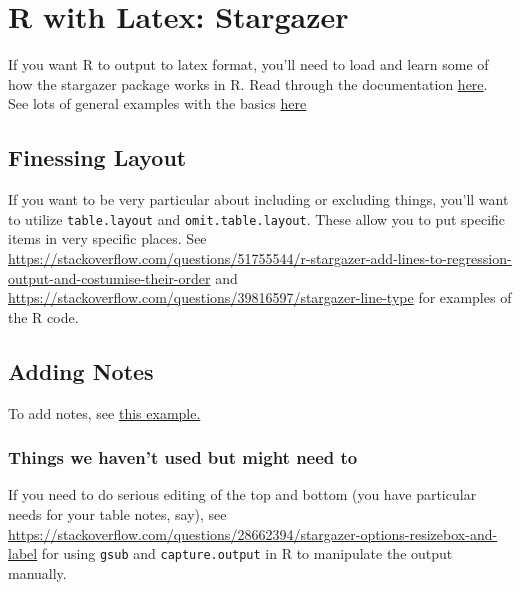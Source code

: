 \section{R with Latex: Stargazer}
If you want R to output to latex format, you'll need to load and learn some of how the stargazer package works in R. Read through the documentation \href{https://www.rdocumentation.org/packages/stargazer/versions/5.2.2/topics/stargazer}{here}. See lots of general examples with the basics \href{https://www.jakeruss.com/cheatsheets/stargazer/#change-which-statistics-are-displayed}{here}

\subsection{Finessing Layout}
If you want to be very particular about including or excluding things, you'll want to utilize \verb+table.layout+ and \verb+omit.table.layout+. These allow you to put specific items in very specific places. See \url{https://stackoverflow.com/questions/51755544/r-stargazer-add-lines-to-regression-output-and-costumise-their-order} and \url{https://stackoverflow.com/questions/39816597/stargazer-line-type} for examples of the R code.

\subsection{Adding Notes}
To add notes, see \href{https://stackoverflow.com/questions/26950517/add-a-row-with-notes-using-stargazer}{this example.}

\subsubsection{Things we haven't used but might need to}
If you need to do serious editing of the top and bottom (you have particular needs for your table notes, say), see \url{https://stackoverflow.com/questions/28662394/stargazer-options-resizebox-and-label} for using \verb+gsub+ and \verb+capture.output+ in R to manipulate the output manually.